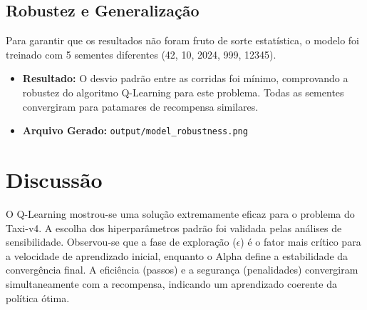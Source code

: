 \documentclass{article}
\begin{document}
\subsection{Robustez e Generalização}
Para garantir que os resultados não foram fruto de sorte estatística, o modelo foi treinado com 5 sementes diferentes (42, 10, 2024, 999, 12345).
\begin{itemize}
    \item \textbf{Resultado:} O desvio padrão entre as corridas foi mínimo, comprovando a robustez do algoritmo Q-Learning para este problema. Todas as sementes convergiram para patamares de recompensa similares.
    \item \textbf{Arquivo Gerado:} \texttt{output/model\_robustness.png}
\end{itemize}

\section{Discussão}
O Q-Learning mostrou-se uma solução extremamente eficaz para o problema do Taxi-v4. A escolha dos hiperparâmetros padrão foi validada pelas análises de sensibilidade. Observou-se que a fase de exploração ($\epsilon$) é o fator mais crítico para a velocidade de aprendizado inicial, enquanto o Alpha define a estabilidade da convergência final. A eficiência (passos) e a segurança (penalidades) convergiram simultaneamente com a recompensa, indicando um aprendizado coerente da política ótima.
\end{document}
